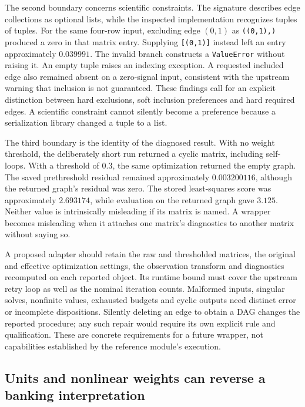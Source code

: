 The second boundary concerns scientific constraints. The signature describes
edge collections as optional lists, while the inspected implementation
recognizes tuples of tuples. For the same four-row input, excluding edge
$(0,1)$ as \texttt{((0,1),)} produced a zero in that matrix entry. Supplying
\texttt{[(0,1)]} instead left an entry approximately $0.039991$.
The invalid branch constructs a \texttt{ValueError} without raising it.
An empty tuple raises an indexing exception. A requested included edge also
remained absent on a zero-signal input, consistent with the upstream warning
that inclusion is not guaranteed. These findings call for an explicit
distinction between hard exclusions, soft inclusion preferences and hard
required edges. A scientific constraint cannot silently become a preference
because a serialization library changed a tuple to a list.
\citep{exec16_dagma_primary,exec16_dagma_runtime}

The third boundary is the identity of the diagnosed result. With no weight
threshold, the deliberately short run returned a cyclic matrix, including
self-loops. With a threshold of $0.3$, the same optimization returned the
empty graph. The saved prethreshold residual remained approximately
$0.003200116$, although the returned graph's residual was zero. The stored
least-squares score was approximately $2.693174$, while evaluation on the
returned graph gave $3.125$. Neither value is intrinsically misleading if
its matrix is named. A wrapper becomes misleading when it attaches one
matrix's diagnostics to another matrix without saying so.
\citep{exec16_dagma_runtime}

A proposed adapter should retain the raw and thresholded matrices, the
original and effective optimization settings, the observation transform and
diagnostics recomputed on each reported object. Its runtime bound must cover
the upstream retry loop as well as the nominal iteration counts. Malformed
inputs, singular solves, nonfinite values, exhausted budgets and cyclic
outputs need distinct error or incomplete dispositions. Silently deleting
an edge to obtain a DAG changes the reported procedure; any such repair
would require its own explicit rule and qualification. These are concrete
requirements for a future wrapper, not capabilities established by the
reference module's execution.
\citep{exec16_dagma_primary,exec16_dagma_runtime}

\subsection{Units and nonlinear weights can reverse a banking interpretation}

